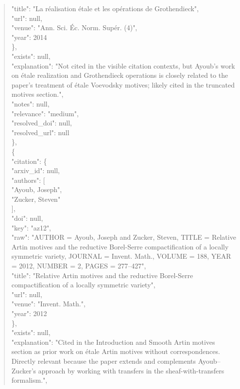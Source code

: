\documentclass[11pt]{article}
\begin{document}
\begin{quote}
        "title": "La réalisation étale et les opérations de Grothendieck",\\
        "url": null,\\
        "venue": "Ann. Sci. Éc. Norm. Supér. (4)",\\
        "year": 2014\\
      \},\\
      "exists": null,\\
      "explanation": "Not cited in the visible citation contexts, but Ayoub's work on étale realization and Grothendieck operations is closely related to the paper's treatment of étale Voevodsky motives; likely cited in the truncated motives section.",\\
      "notes": null,\\
      "relevance": "medium",\\
      "resolved\_doi": null,\\
      "resolved\_url": null\\
    \},\\
    \{\\
      "citation": \{\\
        "arxiv\_id": null,\\
        "authors": [\\
          "Ayoub, Joseph",\\
          "Zucker, Steven"\\
        ],\\
        "doi": null,\\
        "key": "az12",\\
        "raw": "AUTHOR = Ayoub, Joseph and Zucker, Steven, TITLE = Relative Artin motives and the reductive Borel-Serre compactification of a locally symmetric variety, JOURNAL = Invent. Math., VOLUME = 188, YEAR = 2012, NUMBER = 2, PAGES = 277--427",\\
        "title": "Relative Artin motives and the reductive Borel-Serre compactification of a locally symmetric variety",\\
        "url": null,\\
        "venue": "Invent. Math.",\\
        "year": 2012\\
      \},\\
      "exists": null,\\
      "explanation": "Cited in the Introduction and Smooth Artin motives section as prior work on étale Artin motives without correspondences. Directly relevant because the paper extends and complements Ayoub--Zucker's approach by working with transfers in the sheaf-with-transfers formalism.",\\

\end{quote}
\end{document}
